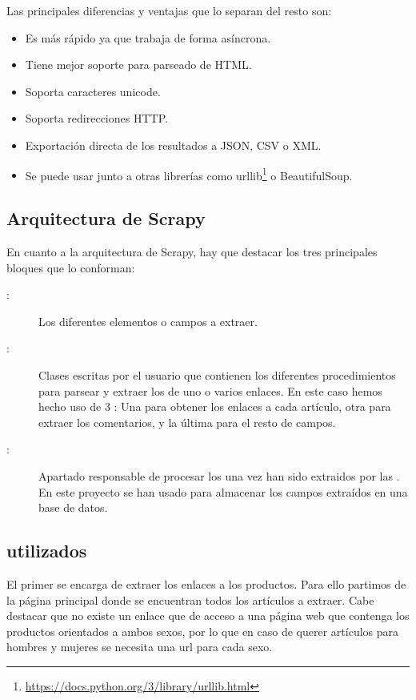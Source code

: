 Las principales diferencias y ventajas que lo separan del resto son:
\begin{itemize}
    \item Es más rápido ya que trabaja de forma asíncrona.
    \item Tiene mejor soporte para parseado de HTML.
    \item Soporta caracteres unicode.
    \item Soporta redirecciones HTTP.
    \item Exportación directa de los resultados a JSON, CSV o XML.
    \item Se puede usar junto a otras librerías como urllib\footnote{\url{https://docs.python.org/3/library/urllib.html}} o BeautifulSoup.
\end{itemize}

\subsection{Arquitectura de Scrapy}

En cuanto a la arquitectura de Scrapy, hay que destacar los tres principales bloques que lo conforman:

\begin{description}
    \item[:] Los diferentes elementos o campos a extraer.
    \item[:] Clases escritas por el usuario que contienen los diferentes procedimientos para parsear y extraer los  de uno o varios enlaces. En este caso hemos hecho uso de 3 : Una para obtener los enlaces a cada artículo, otra para extraer los comentarios, y la última para el resto de campos.
    \item[:] Apartado responsable de procesar los  una vez han sido extraidos por las . En este proyecto se han usado para almacenar los campos extraídos en una base de datos.
\end{description}


\subsection{ utilizados}
El primer  se encarga de extraer los enlaces a los productos. Para ello partimos de la página principal donde se encuentran todos los artículos a extraer. Cabe destacar que no existe un enlace que de acceso a una página web que contenga los productos orientados a ambos sexos, por lo que en caso de querer artículos para hombres y mujeres se necesita una url para cada sexo.

